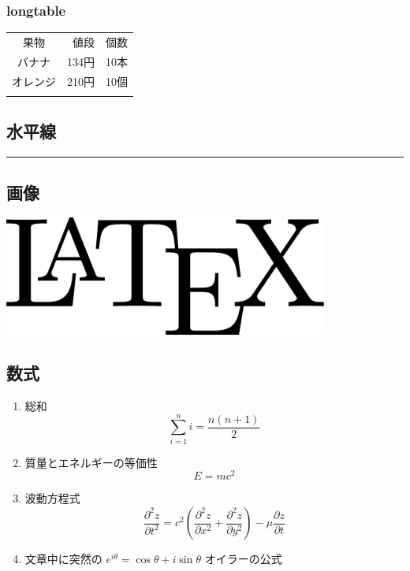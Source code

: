 \subsubsection{longtable}
\begin{longtable}[c]{@{}crr@{}}
\toprule\addlinespace
果物 & 値段 & 個数
\\\addlinespace
\midrule\endhead
バナナ & 134円 & 10本
\\\addlinespace
オレンジ & 210円 & 10個
\\\addlinespace
\bottomrule
\end{longtable}

\subsection{水平線}
\begin{center}\rule{\textwidth}{.5pt}\end{center}

\subsection{画像}
\includegraphics[width=0.8\textwidth]{latex.eps}

\clearpage
\subsection{数式}
\begin{enumerate}

\item 総和
\begin{equation}
\sum_{i=1}^n i = \frac{n(n+1)}{2}
\end{equation}

\item 質量とエネルギーの等価性
\begin{equation}
E = mc ^2
\end{equation}

\item 波動方程式
\begin{equation}
\frac{\partial^2 z}{\partial t^2}=
c^2 (\frac{\partial^2 z}{\partial x^2}+\frac{\partial^2 z}{\partial y^2})-
\mu \frac{\partial z}{\partial t}
\end{equation}

\item 文章中に突然の $e^{i\theta}=\cos\theta+i\sin\theta$ オイラーの公式

\end{enumerate}
